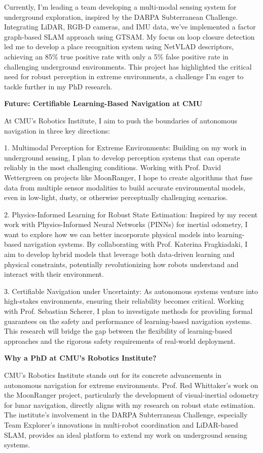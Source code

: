 \documentclass[a4,20pt]{article}
\begin{document}
\begin{large}
Currently, I'm leading a team developing a multi-modal sensing system for underground exploration, inspired by the DARPA Subterranean Challenge. Integrating LiDAR, RGB-D cameras, and IMU data, we've implemented a factor graph-based SLAM approach using GTSAM. My focus on loop closure detection led me to develop a place recognition system using NetVLAD descriptors, achieving an 85\% true positive rate with only a 5\% false positive rate in challenging underground environments. This project has highlighted the critical need for robust perception in extreme environments, a challenge I'm eager to tackle further in my PhD research.

\textbf{Future: Certifiable Learning-Based Navigation at CMU}

At CMU's Robotics Institute, I aim to push the boundaries of autonomous navigation in three key directions:

1. Multimodal Perception for Extreme Environments: Building on my work in underground sensing, I plan to develop perception systems that can operate reliably in the most challenging conditions. Working with Prof. David Wettergreen on projects like MoonRanger, I hope to create algorithms that fuse data from multiple sensor modalities to build accurate environmental models, even in low-light, dusty, or otherwise perceptually challenging scenarios.

2. Physics-Informed Learning for Robust State Estimation: Inspired by my recent work with Physics-Informed Neural Networks (PINNs) for inertial odometry, I want to explore how we can better incorporate physical models into learning-based navigation systems. By collaborating with Prof. Katerina Fragkiadaki, I aim to develop hybrid models that leverage both data-driven learning and physical constraints, potentially revolutionizing how robots understand and interact with their environment.

3. Certifiable Navigation under Uncertainty: As autonomous systems venture into high-stakes environments, ensuring their reliability becomes critical. Working with Prof. Sebastian Scherer, I plan to investigate methods for providing formal guarantees on the safety and performance of learning-based navigation systems. This research will bridge the gap between the flexibility of learning-based approaches and the rigorous safety requirements of real-world deployment.

\textbf{Why a PhD at CMU's Robotics Institute?}

CMU's Robotics Institute stands out for its concrete advancements in autonomous navigation for extreme environments. Prof. Red Whittaker's work on the MoonRanger project, particularly the development of visual-inertial odometry for lunar navigation, directly aligns with my research on robust state estimation. The institute's involvement in the DARPA Subterranean Challenge, especially Team Explorer's innovations in multi-robot coordination and LiDAR-based SLAM, provides an ideal platform to extend my work on underground sensing systems.


\end{large}
\end{document}
